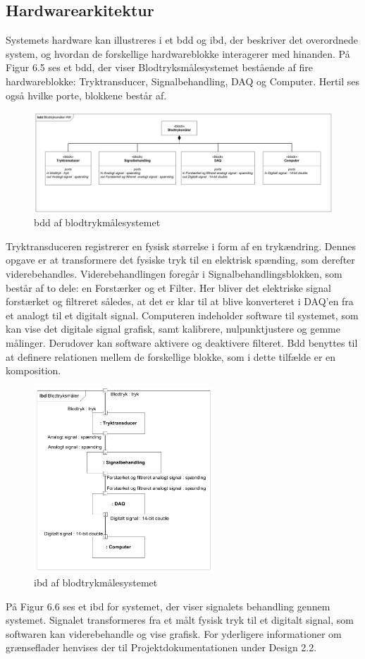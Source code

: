\subsection{Hardwarearkitektur}
Systemets hardware kan illustreres i et bdd og ibd, der beskriver det overordnede system, og hvordan de forskellige hardwareblokke interagerer med hinanden. På Figur 6.5 ses et bdd, der viser Blodtryksmålesystemet bestående af fire hardwareblokke: Tryktransducer, Signalbehandling, DAQ og Computer. Hertil ses også hvilke porte, blokkene består af.
\begin{figure}[H]
	\centering
	\includegraphics[width=1\textwidth]{Figurer/Snip20151209_70}
	\caption{bdd af blodtrykmålesystemet}
\end{figure}
Tryktransduceren registrerer en fysisk størrelse i form af en trykændring. Dennes opgave er at transformere det fysiske tryk til en elektrisk spænding, som derefter viderebehandles. Viderebehandlingen foregår i Signalbehandlingsblokken, som består af to dele: en Forstærker og et Filter. Her bliver det elektriske signal forstærket og filtreret således, at det er klar til at blive konverteret i DAQ’en fra et analogt til et digitalt signal. Computeren indeholder software til systemet, som kan vise det digitale signal grafisk, samt kalibrere, nulpunktjustere og gemme målinger. Derudover kan software aktivere og deaktivere filteret.  
Bdd benyttes til at definere relationen mellem de forskellige blokke, som i dette tilfælde er en komposition. 
\begin{figure}[H]
	\centering
	\includegraphics[width=0.6\textwidth]{Figurer/Snip20151209_72}
	\caption{ibd af blodtrykmålesystemet}
\end{figure}
På Figur 6.6 ses et ibd for systemet, der viser signalets behandling gennem systemet. Signalet transformeres fra et målt fysisk tryk til et digitalt signal, som softwaren kan viderebehandle og vise grafisk. For yderligere informationer om grænseflader henvises der til Projektdokumentationen under Design 2.2.

